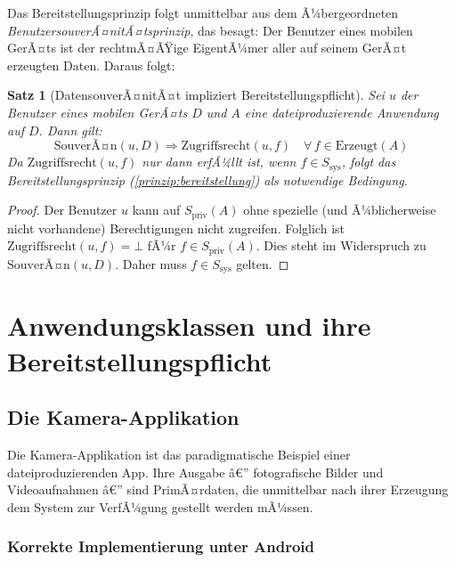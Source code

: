 ﻿\documentclass[12pt, a4paper]{article}
\newtheorem{satz}[definition]{Satz}
\begin{document}
Das Bereitstellungsprinzip folgt unmittelbar aus dem Ã¼bergeordneten
\emph{BenutzersouverÃ¤nitÃ¤tsprinzip}, das besagt: Der Benutzer eines mobilen GerÃ¤ts
ist der rechtmÃ¤ÃŸige EigentÃ¼mer aller auf seinem GerÃ¤t erzeugten Daten. Daraus folgt:

\begin{satz}[DatensouverÃ¤nitÃ¤t impliziert Bereitstellungspflicht]
\label{satz:datensouveraenitaet}
Sei $u$ der Benutzer eines mobilen GerÃ¤ts $D$ und $A$ eine dateiproduzierende
Anwendung auf $D$. Dann gilt:
\[
  \text{SouverÃ¤n}(u, D) \Rightarrow \text{Zugriffsrecht}(u, f) \quad \forall\, f \in \text{Erzeugt}(A)
\]
Da $\text{Zugriffsrecht}(u, f)$ nur dann erfÃ¼llt ist, wenn $f \in S_{\text{sys}}$, folgt
das Bereitstellungsprinzip (\cref{prinzip:bereitstellung}) als notwendige Bedingung.
\end{satz}

\begin{proof}
Der Benutzer $u$ kann auf $S_{\text{priv}}(A)$ ohne spezielle (und Ã¼blicherweise nicht
vorhandene) Berechtigungen nicht zugreifen. Folglich ist $\text{Zugriffsrecht}(u, f) = \bot$
fÃ¼r $f \in S_{\text{priv}}(A)$. Dies steht im Widerspruch zu $\text{SouverÃ¤n}(u, D)$.
Daher muss $f \in S_{\text{sys}}$ gelten.
\end{proof}

\section{Anwendungsklassen und ihre Bereitstellungspflicht}
\label{sec:anwendungsklassen}

\subsection{Die Kamera-Applikation}

Die Kamera-Applikation ist das paradigmatische Beispiel einer dateiproduzierenden App.
Ihre Ausgabe â€” fotografische Bilder und Videoaufnahmen â€” sind PrimÃ¤rdaten, die unmittelbar
nach ihrer Erzeugung dem System zur VerfÃ¼gung gestellt werden mÃ¼ssen.

\subsubsection{Korrekte Implementierung unter Android}
\end{document}
